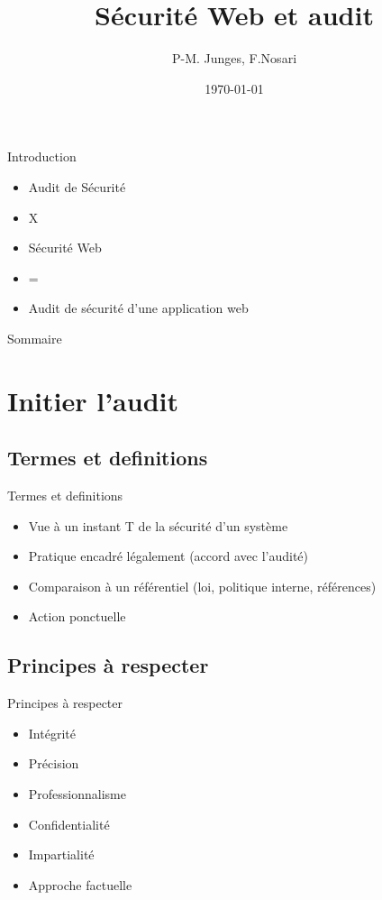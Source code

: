 \documentclass{beamer}
\title{Sécurité Web et audit}
\author{P-M. Junges, F.Nosari}
\institute{Faculté des Sciences et Technologies}
\date{\today}
\begin{document}
\begin{frame}
	\titlepage
\end{frame}

\begin{frame}{Introduction}
	\begin{itemize}
		\item Audit de Sécurité
		\item X
		\item Sécurité Web
		\item = 
		\item Audit de sécurité d'une application web
	\end{itemize}
\end{frame}

\begin{frame}{Sommaire}
	\tableofcontents
\end{frame}


\section{Initier l'audit}
	\subsection{Termes et definitions}
	\begin{frame}{Termes et definitions}
		\begin{itemize}
			\item Vue à un instant T de la sécurité d'un système
			\item Pratique encadré légalement (accord avec l'audité)
			\item Comparaison à un référentiel (loi, politique interne, références)
			\item Action ponctuelle
		\end{itemize}
	\end{frame}


	\subsection{Principes à respecter}
	\begin{frame}{Principes à respecter}
		\begin{itemize}
			\item Intégrité
			\item Précision
			\item Professionnalisme
			\item Confidentialité
			\item Impartialité
			\item Approche factuelle
		\end{itemize}
	
	\end{frame}
\end{document}
